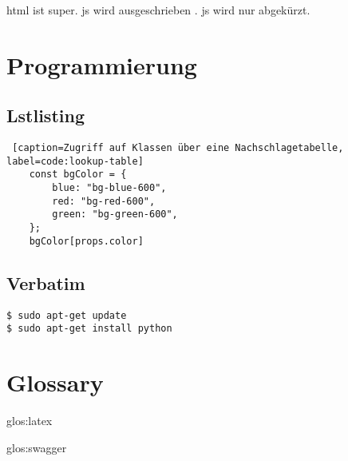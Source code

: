 \ac{html} ist super. \acf{js} wird ausgeschrieben . \acs{js} wird nur abgekürzt.

\chapter{Programmierung}

\section{Lstlisting}

\begin{lstlisting} [caption=Zugriff auf Klassen über eine Nachschlagetabelle, label=code:lookup-table]
    const bgColor = {
        blue: "bg-blue-600",
        red: "bg-red-600",
        green: "bg-green-600",
    };
    bgColor[props.color]
\end{lstlisting}

\section{Verbatim}

\begin{verbatim}
$ sudo apt-get update
$ sudo apt-get install python
\end{verbatim}

\chapter{Glossary}

\gls{glos:latex}

\gls{glos:swagger}
